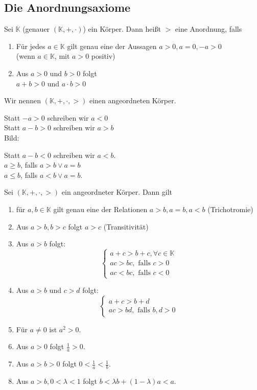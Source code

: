 \documentclass[../ana1.tex]{subfiles}
\begin{document}
\subsection{Die Anordnungsaxiome}
\begin{defi} %
	Sei \(\mathbb{K}\) (genauer \((\mathbb{K},+,\cdot)\)) ein Körper. Dann heißt \(>\) eine Anordnung, falls
	\begin{enumerate}
		\item Für jedes \(a\in\mathbb{K}\) gilt genau eine der Aussagen \(a>0,a=0,-a>0\) \\
		      (wenn \(a\in\mathbb{K}\), mit \(a>0\) positiv)
		\item Aus \(a>0\) und \(b>0\) folgt\\
		      \(a+b>0\) und \(a\cdot b>0\)
	\end{enumerate}
	Wir nennen \((\mathbb{K},+,\cdot,>)\) einen angeordneten Körper.
\end{defi}
\begin{bem}
	Statt \(-a>0\) schreiben wir \(a<0\) \\
	Statt \(a-b>0\) schreiben wir \(a>b\) \\
	Bild:
	\begin{center}
	\end{center}
	Statt \(a-b<0\) schreiben wir \(a<b\).\\
	\(a \geq b\), falls \(a>b \vee a=b\) \\
	\(a \leq b\), falls \(a<b \vee a=b\).
\end{bem}
\begin{satz}
	Sei \((\mathbb{K}, +,\cdot, >)\) ein angeordneter Körper. Dann gilt
	\begin{enumerate}
		\item für \(a,b\in\mathbb{K}\) gilt genau eine der Relationen \(a>b, a=b, a<b\) (Trichotromie)
		\item Aus \(a>b, b>c\) folgt \(a>c\) (Transitivität)
		\item Aus \(a>b\) folgt:
			\[\begin{cases}
				a+c>b+c, \forall c\in\mathbb{K} \\
				ac>bc, \text{ falls } c>0       \\
				ac<bc, \text{ falls } c<0
			\end{cases}\]
		\item Aus \(a>b\) und \(c>d\) folgt:\\
			\[\begin{cases}
				a+c>b+d \\
				ac>bd, \text{ falls } b,d>0 %
			\end{cases}\]
		\item Für \(a\neq 0\) ist \(a^2 >0\).
		\item Aus \(a>0\) folgt \(\frac{1}{a}>0\).
		\item Aus \(a>b>0\) folgt \(0<\frac{1}{a}<\frac{1}{b}\).
		\item Aus \(a>b, 0<\lambda<1\) folgt \(b<\lambda b + (1-\lambda)a<a\).
	\end{enumerate}
\end{satz}
\end{document}
